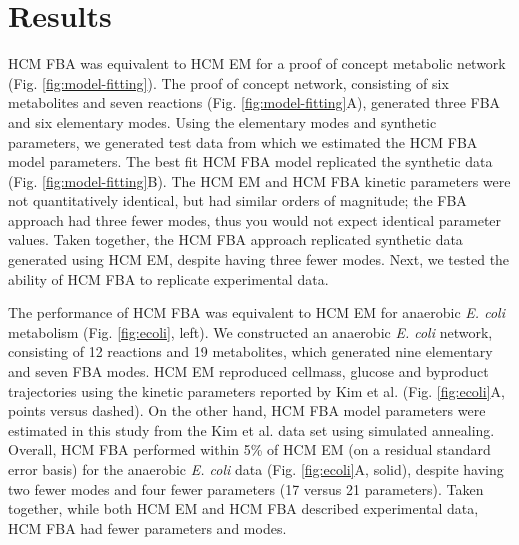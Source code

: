 \documentclass[10pt,twocolumn,twoside,final]{IEEEtran}
\begin{document}
\section{Results}
HCM FBA was equivalent to HCM EM for a proof of concept metabolic network (Fig. \ref{fig:model-fitting}).
The proof of concept network, consisting of six metabolites and seven reactions (Fig. \ref{fig:model-fitting}A), generated three FBA and six elementary modes.
Using the elementary modes and synthetic parameters, we generated test data from which we estimated the HCM FBA model parameters.
The best fit HCM FBA model replicated the synthetic data (Fig. \ref {fig:model-fitting}B).
The HCM EM and HCM FBA kinetic parameters were not quantitatively identical, but had similar orders of magnitude;
the FBA approach had three fewer modes, thus you would not expect identical parameter values.
Taken together, the HCM FBA approach replicated synthetic data generated using HCM EM, despite having three fewer modes.
Next, we tested the ability of HCM FBA to replicate experimental data.


The performance of HCM FBA was equivalent to HCM EM for anaerobic \textit{E. coli} metabolism (Fig. \ref{fig:ecoli}, left).
We constructed an anaerobic \textit{E. coli} network, consisting of 12 reactions and 19 metabolites, which generated nine elementary and seven FBA modes.
HCM EM reproduced cellmass, glucose and byproduct trajectories
using the kinetic parameters reported by Kim et al. \cite{2008_kim_varner_ramkrishna_BiotechProg} (Fig. \ref{fig:ecoli}A, points versus dashed).
On the other hand, HCM FBA model parameters were estimated in this study from the Kim et al. data set using simulated annealing.
Overall, HCM FBA performed within 5\% of HCM EM (on a residual standard error basis) for the anaerobic \textit{E. coli} data (Fig. \ref {fig:ecoli}A, solid),
despite having two fewer modes and four fewer parameters (17 versus 21 parameters).
Taken together, while both HCM EM and HCM FBA described experimental data, HCM FBA had fewer parameters and modes.
\end{document}
